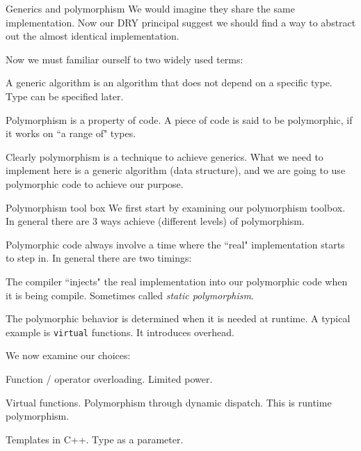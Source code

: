 \begin{frame}{Generics and polymorphism}
We would imagine they share the same implementation. Now our DRY principal suggest we should find a way to abstract out the almost identical implementation. 

Now we must familiar ourself to two widely used terms:

\begin{description}[Polymorphism]
	\item[Generics] A generic algorithm is an algorithm that does not depend on a specific type. Type can be specified later.
	\item[Polymorphism] Polymorphism is a property of code. A piece of code is said to be polymorphic, if it works on ``a range of" types. 
\end{description}

Clearly polymorphism is a technique to achieve generics. What we need to implement here is a generic algorithm (data structure), and we are going to use polymorphic code to achieve our purpose.
\end{frame}

\begin{frame}{Polymorphism tool box}
We first start by examining our polymorphism toolbox. In general there are 3 ways achieve (different levels) of polymorphism. 

Polymorphic code always involve a time where the ``real" implementation starts to step in. In general there are two timings:
\begin{description}
	\item[Compile-time] The compiler ``injects" the real implementation into our polymorphic code when it is being compile. Sometimes called \textit{static polymorphism}.
	\item[Runtime] The polymorphic behavior is determined when it is needed at runtime. A typical example is \texttt{virtual} functions. It introduces overhead.
\end{description}

We now examine our choices:

\begin{description}[Overloading]
	\item[Overloading] Function / operator overloading. Limited power.
	\item[Subtyping] Virtual functions. Polymorphism through dynamic dispatch. This is runtime polymorphism.
	\item[Parametric] Templates in C++. Type as a parameter. 
\end{description}
\end{frame}

